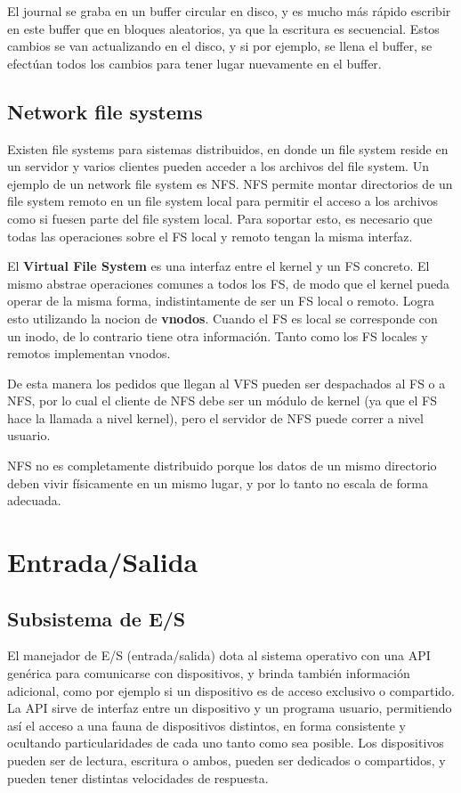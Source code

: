 \documentclass{article}
\begin{document}
El journal se graba en un buffer circular en disco, y es mucho m\'as r\'apido escribir en este buffer que en bloques aleatorios, ya que la escritura es secuencial. Estos cambios se van actualizando en el disco, y si por ejemplo, se llena el buffer, se efectúan todos los cambios para tener lugar nuevamente en el buffer.

\subsection{Network file systems}

Existen file systems para sistemas distribuidos, en donde un file system reside en un servidor y varios clientes pueden acceder a los archivos del file system. Un ejemplo de un network file system es NFS. NFS permite montar directorios de un file system remoto en un file system local para permitir el acceso a los archivos como si fuesen parte del file system local. Para soportar esto, es necesario que todas las operaciones sobre el FS local y remoto tengan la misma interfaz.

El \textbf{Virtual File System} es una interfaz entre el kernel y un FS concreto. El mismo abstrae operaciones comunes a todos los FS, de modo que el kernel pueda operar de la misma forma, indistintamente de ser un FS local o remoto. Logra esto utilizando la nocion de \textbf{vnodos}. Cuando el FS es local se corresponde con un inodo, de lo contrario tiene otra información. Tanto como los FS locales y remotos implementan vnodos.

De esta manera los pedidos que llegan al VFS pueden ser despachados al FS o a NFS, por lo cual el cliente de NFS debe ser un módulo de kernel (ya que el FS hace la llamada a nivel kernel), pero el servidor de NFS puede correr a nivel usuario.

NFS no es completamente distribuido porque los datos de un mismo directorio deben vivir físicamente en un mismo lugar, y por lo tanto no escala de forma adecuada.

\section{Entrada/Salida}

\subsection{Subsistema de E/S}

El manejador de E/S (entrada/salida) dota al sistema operativo con una API genérica para comunicarse con dispositivos, y brinda también información adicional, como por ejemplo si un dispositivo es de acceso exclusivo o compartido. La API sirve de interfaz entre un dispositivo y un programa usuario, permitiendo así el acceso a una fauna de dispositivos distintos, en forma consistente y ocultando particularidades de cada uno tanto como sea posible. Los dispositivos pueden ser de lectura, escritura o ambos, pueden ser dedicados o compartidos, y pueden tener distintas velocidades de respuesta.
\end{document}

